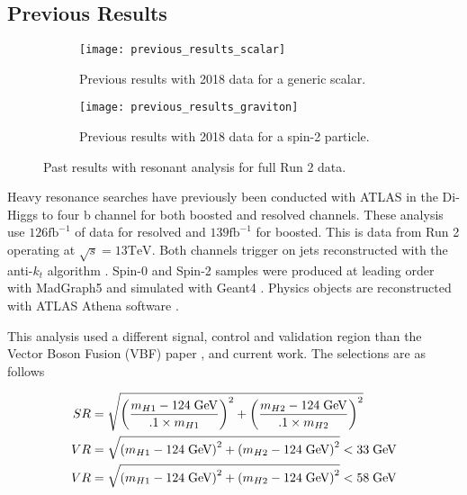 \documentclass[12pt]{article}
\begin{document}
\subsection{Previous Results}
\begin{figure}[t]
    \centering
    \begin{subfigure}[t]{.48\textwidth}
        \centering
        \texttt{[image: previous\_results\_scalar]}
        \caption{Previous results with 2018 data for a generic scalar.}
        \label{subfig:previous_results_scalar}
    \end{subfigure}
    \hfill
    \begin{subfigure}[t]{.48\textwidth}
        \centering
        \texttt{[image: previous\_results\_graviton]}
        \caption{Previous results with 2018 data for a spin-2 particle.}
        \label{subfig:previous_results_graviton}
    \end{subfigure}
\caption{Past results with resonant analysis for full Run 2 data.}
\label{fig:previous_results}
\end{figure}

Heavy resonance searches have previously been conducted with ATLAS in the Di-Higgs
to four b channel for both boosted and resolved channels. These analysis use
$126 \text{fb}^{-1}$ of data for resolved and $139\text{fb}^{-1}$ for boosted.
This is data from Run 2 operating at $\sqrt{s}=13\text{TeV}$. Both channels
trigger on jets reconstructed with the anti-$k_t$ algorithm \cite{antikt}.
Spin-0 and Spin-2 samples were produced at leading order with MadGraph5
\cite{madgraph5_OG} and simulated with Geant4 \cite{geant4}. Physics objects are
reconstructed with ATLAS Athena software \cite{atlas_simulation}.

This analysis used a different signal, control and validation region than the
Vector Boson Fusion (VBF) paper \cite{atlas_hhbbbb_vbf}, and current work. The
selections are as follows

\begin{align} \label{eq:vbf_sr}
    SR &= \sqrt{\left( \frac{m_{H1} - 124\;\text{GeV}}{.1\times m_{H1} } \right)^2 +
    \left( \frac{m_{H2} - 124\;\text{GeV}}{.1\times m_{H2}} \right)^2} \\
    VR &= \sqrt{\left( m_{H1} - 124\;\text{GeV} \right)^2 + \left( m_{H2} -
    124\;\text{GeV} \right)^2} < 33\;\text{GeV} \\
    VR &= \sqrt{\left( m_{H1} - 124\;\text{GeV} \right)^2 + \left( m_{H2} -
    124\;\text{GeV} \right)^2} < 58\;\text{GeV}
\end{align}
\end{document}
